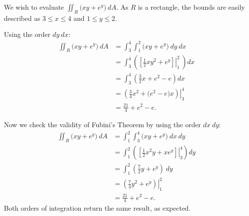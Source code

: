 {We wish to evaluate $\iint_R \big(xy+e^y\big)\ dA$. As $R$ is a rectangle, the bounds are easily described as $3\leq x\leq 4$ and $1\leq y\leq 2$.\\


Using the order $dy\ dx$:
\begin{align*}
\iint_R\big(xy+e^y\big) \ dA
	&= \int_3^4\int_1^2\big(xy+e^y\big)\ dy \ dx \\
	&= \int_3^4 \left(\left.\left[\frac12xy^2+e^y\right]\right|_1^2\ \right) dx \\
	&= \int_3^4\left(\frac 32x + e^2-e\right)dx \\
	&= \left.\left(\frac 34x^2 + \big(e^2-e\big)x\right)\right|_3^4 \\
	&= \frac {21}4+ e^2-e%
	.
\end{align*}

Now we check the validity of Fubini's Theorem by using the order $dx\ dy$:
\begin{align*}
\iint_R\big(xy+e^y\big) \ dA &= \int_1^2\int_3^4\big(xy+e^y\big)\ dx \ dy \\
		&= \int_1^2\left(\left.\left[\frac12x^2y+xe^y\right]\right|_3^4\right)dy\\
		&= \int_1^2\left(\frac72y+e^y\right)\ dy\\
		&= \left.\left(\frac74y^2+e^y\right)\right|_1^2\\
		&=\frac{21}4+e^2-e%
		.
\end{align*}
Both orders of integration return the same result, as expected.}

